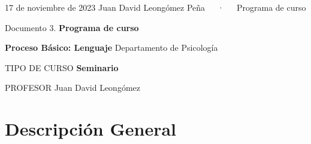 \documentclass[11pt,a4paper,]{awesome-cv}
\begin{document}
\makecvheader

\makecvfooter
  {17 de noviembre de 2023}
    {Juan David Leongómez Peña~~~·~~~Programa de curso}
  {\thepage}





\vspace{4mm}
\begin{tcolorbox}[enhanced,
        on line, 
        boxsep=4pt, left=0pt,right=0pt,top=0pt,bottom=0pt,
        colframe=white,colback=black]
  
\color{white}
\begin{LARGE}\begin{center}
Documento 3. \textbf{Programa de curso}
\end{center}\end{LARGE}
\end{tcolorbox}

\begin{LARGE}\begin{center}
\textbf{Proceso Básico: Lenguaje}\linebreak
Departamento de Psicología
\end{center}\end{LARGE}

\begin{cvskills}
  \cvskill
    {TIPO DE CURSO}
    {\textbf{Seminario}}
    
  \cvskill
    {PROFESOR}
    {Juan David Leongómez}
\end{cvskills}

\hypertarget{descripciuxf3n-general}{%
\section{Descripción General}\label{descripciuxf3n-general}}
\end{document}
